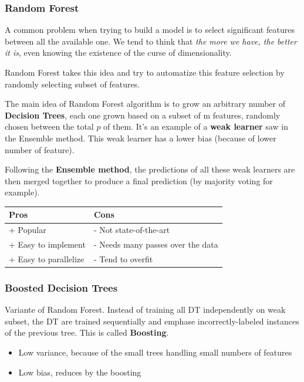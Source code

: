 \subsubsection{Random Forest}

A common problem when trying to build a model is to select significant features between all the available one. We tend to think that \textit{the more we have, the better it is}, even knowing the existence of the curse of dimensionality. 

Random Forest takes this idea and try to automatize this feature selection by randomly selecting subset of features.

The main idea of Random Forest algorithm is to grow an arbitrary number of \textbf{Decision Trees}, each one grown based on a subset of m features, randomly chosen between the total $p$ of them. It's an example of a \textbf{weak learner} saw in the Ensemble method. This weak learner has a lower bias (because of lower number of feature).

Following the \textbf{Ensemble method}, the predictions of all these weak learners are then merged together to produce a final prediction (by majority voting for example).



\begin{center} %
\begin{tabular} {| l | l |}
\hline
\bf Pros & \bf Cons \\ \hline
+ Popular & - Not state-of-the-art  \\
+ Easy to implement & - Needs many passes over the data \\
+ Easy to parallelize & - Tend to overfit \\ 
\hline
\end{tabular}
\end{center}

\subsubsection{Boosted Decision Trees}
Variante of Random Forest. Instead of training all DT independently on weak subset, the DT are trained sequentially and emphase incorrectly-labeled instances of the previous tree. This is called \textbf{Boosting}. 
\begin{itemize}
\item Low variance, because of the small trees handling small numbers of features
\item Low bias, reduces by the boosting
\end{itemize}

